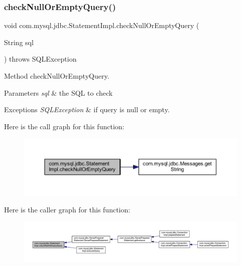 \subsubsection{\texorpdfstring{check\+Null\+Or\+Empty\+Query()}{checkNullOrEmptyQuery()}}
{\footnotesize\ttfamily void com.\+mysql.\+jdbc.\+Statement\+Impl.\+check\+Null\+Or\+Empty\+Query (\begin{DoxyParamCaption}\item[{String}]{sql }\end{DoxyParamCaption}) throws S\+Q\+L\+Exception\hspace{0.3cm}{\ttfamily [protected]}}

Method check\+Null\+Or\+Empty\+Query.


\begin{DoxyParams}{Parameters}
{\em sql} & the S\+QL to check\\
\hline
\end{DoxyParams}

\begin{DoxyExceptions}{Exceptions}
{\em S\+Q\+L\+Exception} & if query is null or empty. \\
\hline
\end{DoxyExceptions}
Here is the call graph for this function\+:
\nopagebreak
\begin{figure}[H]
\begin{center}
\leavevmode
\includegraphics[width=350pt]{classcom_1_1mysql_1_1jdbc_1_1_statement_impl_a29ea5f4b5f00602d6b7845623c616a7d_cgraph}
\end{center}
\end{figure}
Here is the caller graph for this function\+:
\nopagebreak
\begin{figure}[H]
\begin{center}
\leavevmode
\includegraphics[width=350pt]{classcom_1_1mysql_1_1jdbc_1_1_statement_impl_a29ea5f4b5f00602d6b7845623c616a7d_icgraph}
\end{center}
\end{figure}
\mbox{\label{classcom_1_1mysql_1_1jdbc_1_1_statement_impl_adfc1b8c91ff6752b061d02293fc4dd78}} 
